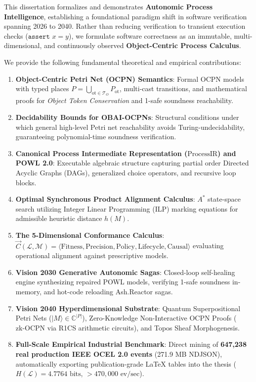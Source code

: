 \documentclass[11pt,a4paper,oneside]{book}
\theoremstyle{definition}
\begin{document}
This dissertation formalizes and demonstrates \textbf{Autonomic Process Intelligence}, establishing a foundational paradigm shift in software verification spanning 2026 to 2040. Rather than reducing verification to transient execution checks ($\texttt{assert } x = y$), we formulate software correctness as an immutable, multi-dimensional, and continuously observed \textbf{Object-Centric Process Calculus}. 

We provide the following fundamental theoretical and empirical contributions:
\begin{enumerate}
    \item \textbf{Object-Centric Petri Net (OCPN) Semantics}: Formal OCPN models with typed places $P = \bigcup_{\text{ot} \in \mathcal{T}_O} P_{\text{ot}}$, multi-cast transitions, and mathematical proofs for \emph{Object Token Conservation} and 1-safe soundness reachability.
    \item \textbf{Decidability Bounds for OBAI-OCPNs}: Structural conditions under which general high-level Petri net reachability avoids Turing-undecidability, guaranteeing polynomial-time soundness verification.
    \item \textbf{Canonical Process Intermediate Representation ($\text{ProcessIR}$) and POWL 2.0}: Executable algebraic structure capturing partial order Directed Acyclic Graphs (DAGs), generalized choice operators, and recursive loop blocks.
    \item \textbf{Optimal Synchronous Product Alignment Calculus}: $A^*$ state-space search utilizing Integer Linear Programming (ILP) marking equations for admissible heuristic distance $h(M)$.
    \item \textbf{The 5-Dimensional Conformance Calculus}: $\vec{C}(\mathcal{L}, \mathcal{M}) = \langle \text{Fitness}, \text{Precision}, \text{Policy}, \text{Lifecycle}, \text{Causal} \rangle$ evaluating operational alignment against prescriptive models.
    \item \textbf{Vision 2030 Generative Autonomic Sagas}: Closed-loop self-healing engine synthesizing repaired POWL models, verifying 1-safe soundness in-memory, and hot-code reloading Ash.Reactor sagas.
    \item \textbf{Vision 2040 Hyperdimensional Substrate}: Quantum Superpositional Petri Nets ($|M\rangle \in \mathbb{C}^{|P|}$), Zero-Knowledge Non-Interactive OCPN Proofs ($\text{zk-OCPN}$ via R1CS arithmetic circuits), and Topos Sheaf Morphogenesis.
    \item \textbf{Full-Scale Empirical Industrial Benchmark}: Direct mining of \textbf{647,238 real production IEEE OCEL 2.0 events} (271.9 MB NDJSON), automatically exporting publication-grade LaTeX tables into the thesis ($H(\mathcal{L}) = 4.7764\text{ bits}$, $>470,000\text{ ev/sec}$).
\end{enumerate}
\end{document}
